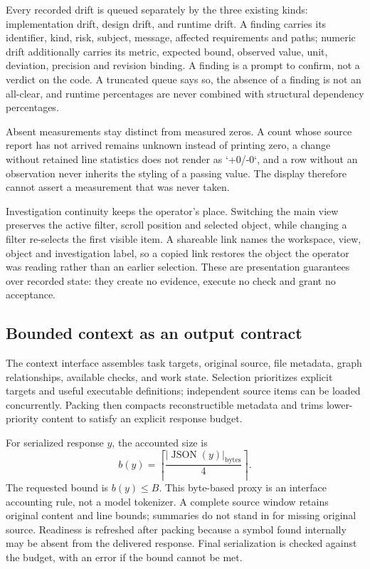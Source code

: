 Every recorded drift is queued separately by the three existing kinds: implementation drift, design drift, and runtime drift. A finding carries its identifier, kind, risk, subject, message, affected requirements and paths; numeric drift additionally carries its metric, expected bound, observed value, unit, deviation, precision and revision binding. A finding is a prompt to confirm, not a verdict on the code. A truncated queue says so, the absence of a finding is not an all-clear, and runtime percentages are never combined with structural dependency percentages.

Absent measurements stay distinct from measured zeros. A count whose source report has not arrived remains unknown instead of printing zero, a change without retained line statistics does not render as `+0/-0`, and a row without an observation never inherits the styling of a passing value. The display therefore cannot assert a measurement that was never taken.

Investigation continuity keeps the operator's place. Switching the main view preserves the active filter, scroll position and selected object, while changing a filter re-selects the first visible item. A shareable link names the workspace, view, object and investigation label, so a copied link restores the object the operator was reading rather than an earlier selection. These are presentation guarantees over recorded state: they create no evidence, execute no check and grant no acceptance.

\subsection{Bounded context as an output contract}
The context interface assembles task targets, original source, file metadata, graph relationships, available checks, and work state. Selection prioritizes explicit targets and useful executable definitions; independent source items can be loaded concurrently. Packing then compacts reconstructible metadata and trims lower-priority content to satisfy an explicit response budget.

For serialized response $y$, the accounted size is
\begin{equation}
 b(y)=\left\lceil\frac{|\operatorname{JSON}(y)|_{\mathrm{bytes}}}{4}\right\rceil.
 \label{eq:budget}
\end{equation}
The requested bound is $b(y)\le B$. This byte-based proxy is an interface accounting rule, not a model tokenizer. A complete source window retains original content and line bounds; summaries do not stand in for missing original source. Readiness is refreshed after packing because a symbol found internally may be absent from the delivered response. Final serialization is checked against the budget, with an error if the bound cannot be met.

